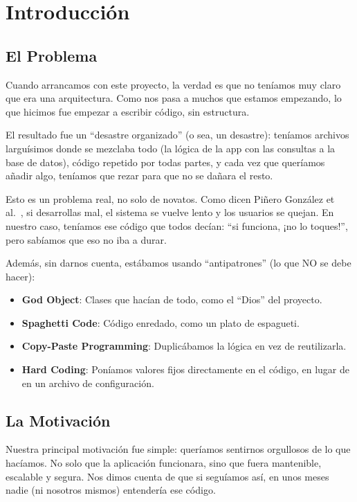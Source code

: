 \section{Introducción}

\subsection{El Problema}

Cuando arrancamos con este proyecto, la verdad es que no teníamos muy claro que era una arquitectura. Como nos pasa a muchos que estamos empezando, lo que hicimos fue empezar a escribir código, sin estructura.

El resultado fue un ``desastre organizado'' (o sea, un desastre): teníamos archivos larguísimos donde se mezclaba todo (la lógica de la app con las consultas a la base de datos), código repetido por todas partes, y cada vez que queríamos añadir algo, teníamos que rezar para que no se dañara el resto.

Esto es un problema real, no solo de novatos. Como dicen Piñero González et al.~\cite{pinero2021buenas}, si desarrollas mal, el sistema se vuelve lento y los usuarios se quejan. En nuestro caso, teníamos ese código que todos decían: ``si funciona, ¡no lo toques!'', pero sabíamos que eso no iba a durar.

Además, sin darnos cuenta, estábamos usando ``antipatrones'' (lo que NO se debe hacer):

\begin{itemize}
    \item \textbf{God Object}: Clases que hacían de todo, como el ``Dios'' del proyecto.
    \item \textbf{Spaghetti Code}: Código enredado, como un plato de espagueti.
    \item \textbf{Copy-Paste Programming}: Duplicábamos la lógica en vez de reutilizarla.
    \item \textbf{Hard Coding}: Poníamos valores fijos directamente en el código, en lugar de en un archivo de configuración.
\end{itemize}

\subsection{La Motivación}

Nuestra principal motivación fue simple: queríamos sentirnos orgullosos de lo que hacíamos. No solo que la aplicación funcionara, sino que fuera mantenible, escalable y segura. Nos dimos cuenta de que si seguíamos así, en unos meses nadie (ni nosotros mismos) entendería ese código.

